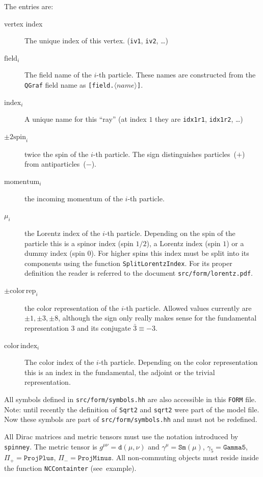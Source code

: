 \documentclass[11pt,a4paper]{refrep}
\newcommand{\qgraf}{{\tt QGraf}\xspace}
\newcommand{\form}{{\tt FORM}\xspace}
\begin{document}
The entries are:
\begin{description}
\item[vertex index] The unique index of this vertex. (\texttt{iv1}, \texttt{iv2}, \dots)
\item[$\mathrm{field}_i$] The field name of the $i$-th particle. These names are constructed
from the \qgraf{} field name as \texttt{[field.$\langle name\rangle$]}.
\item[$\mathrm{index}_i$] A unique name for this ``ray'' (at index $1$ they are \texttt{idx1r1},
   \texttt{idx1r2}, \ldots)
\item[$\pm2\mathrm{spin}_i$] twice the spin of the $i$-th particle.
   The sign distinguishes particles~($+$) from antiparticles~($-$).
\item[$\mathrm{momentum}_i$] the incoming momentum of the $i$-th particle.
\item[$\mu_i$] the Lorentz index of the $i$-th particle. Depending on the spin of the particle
   this is a spinor index (spin $1/2$), a Lorentz index (spin $1$) or a dummy index (spin $0$).
   For higher spins this index must be split into its components using the function
   \texttt{SplitLorentzIndex}. For its proper definition the reader is referred to
   the document \texttt{src/form/lorentz.pdf}.
\item[$\pm\mathrm{color\,rep}_i$] the color representation of the $i$-th particle. Allowed
   values currently are $\pm1,\pm3,\pm8$, although the sign only really makes sense for the
   fundamental representation $3$ and its conjugate $\bar{3}\equiv-3$.
\item[$\mathrm{color\,index}_i$] The color index of the $i$-th particle. Depending on the color
   representation this is an index in the fundamental, the adjoint or the trivial representation.
\end{description}

All symbols defined in \texttt{src/form/symbols.hh} are also accessible in this \form{} file.
\attention Note: until recently the definition of \texttt{Sqrt2} and \texttt{sqrt2} were part
of the model file. Now these symbols are part of \texttt{src/form/symbols.hh} and must not be
redefined.

\attention All Dirac matrices and metric tensors must use the notation introduced by \texttt{spinney}.
The metric tensor is $g^{\mu\nu}=\mathtt{d}(\mu, \nu)$ and $\gamma^\mu=\mathtt{Sm}(\mu)$,
$\gamma_5=\mathtt{Gamma5}$, $\Pi_+=\mathtt{ProjPlus}$, $\Pi_-=\mathtt{ProjMinus}$. All non-commuting
objects must reside inside the function \texttt{NCContainter} (see~example).
\end{document}
